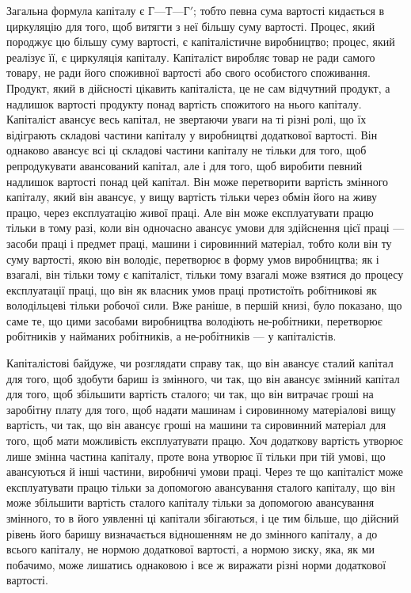 Загальна формула капіталу є $Г — Т — Г'$; тобто певна сума
вартості кидається в циркуляцію для того, щоб витягти з неї
більшу суму вартості. Процес, який породжує цю більшу суму
вартості, є капіталістичне виробництво; процес, який реалізує
її, є циркуляція капіталу. Капіталіст виробляє товар не ради
самого товару, не ради його споживної вартості або свого особистого
споживання. Продукт, який в дійсності цікавить капіталіста,
це не сам відчутний продукт, а надлишок вартості продукту
понад вартість спожитого на нього капіталу. Капіталіст
авансує весь капітал, не звертаючи уваги на ті різні ролі, що їх
відіграють складові частини капіталу у виробництві додаткової
вартості. Він однаково авансує всі ці складові частини капіталу
не тільки для того, щоб репродукувати авансований капітал, але
і для того, щоб виробити певний надлишок вартості понад
цей капітал. Він може перетворити вартість змінного капіталу,
який він авансує, у вищу вартість тільки через обмін його на
живу працю, через експлуатацію живої праці. Але він може експлуатувати
працю тільки в тому разі, коли він одночасно авансує
умови для здійснення цієї праці — засоби праці і предмет
праці, машини і сировинний матеріал, тобто коли він ту суму
вартості, якою він володіє, перетворює в форму умов виробництва;
як і взагалі, він тільки тому є капіталіст, тільки тому взагалі
може взятися до процесу експлуатації праці, що він як власник
умов праці протистоїть робітникові як володільцеві тільки робочої
сили. Вже раніше, в першій книзі, було показано, що саме
те, що цими засобами виробництва володіють не-робітники, перетворює
робітників у найманих робітників, а не-робітників — у капіталістів.

Капіталістові байдуже, чи розглядати справу так, що він
авансує сталий капітал для того, щоб здобути бариш із змінного,
чи так, що він авансує змінний капітал для того, щоб збільшити
вартість сталого; чи так, що він витрачає гроші на заробітну
плату для того, щоб надати машинам і сировинному матеріалові
вищу вартість, чи так, що він авансує гроші на машини та сировинний
матеріал для того, щоб мати можливість експлуатувати працю.
Хоч додаткову вартість утворює лише змінна частина капіталу,
проте вона утворює її тільки при тій умові, що авансуються
й інші частини, виробничі умови праці. Через те що капіталіст
може експлуатувати працю тільки за допомогою авансування сталого
капіталу, що він може збільшити вартість сталого капіталу
тільки за допомогою авансування змінного, то в його уявленні
ці капітали збігаються, і це тим більше, що дійсний рівень його
баришу визначається відношенням не до змінного капіталу, а
до всього капіталу, не нормою додаткової вартості, а нормою
зиску, яка, як ми побачимо, може лишатись однаковою і все ж
виражати різні норми додаткової вартості.

